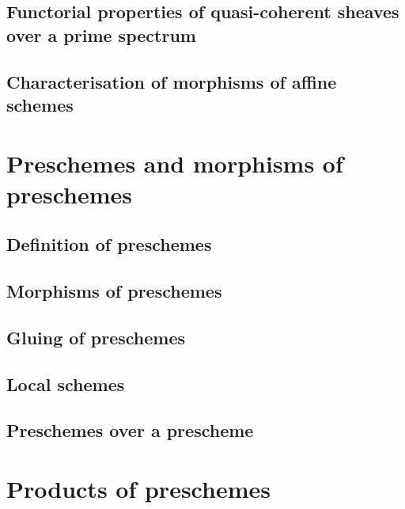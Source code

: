 \documentclass[10pt,oneside]{amsart}
\begin{document}
        \subsection{Functorial properties of quasi-coherent sheaves over a prime spectrum}
        
       
        \subsection{Characterisation of morphisms of affine schemes}
        

    \section{Preschemes and morphisms of preschemes}

        \subsection{Definition of preschemes}
        

        \subsection{Morphisms of preschemes}
        

        \subsection{Gluing of preschemes}
        

        \subsection{Local schemes}
        

        \subsection{Preschemes over a prescheme}
        

    \section{Products of preschemes}
\end{document}
